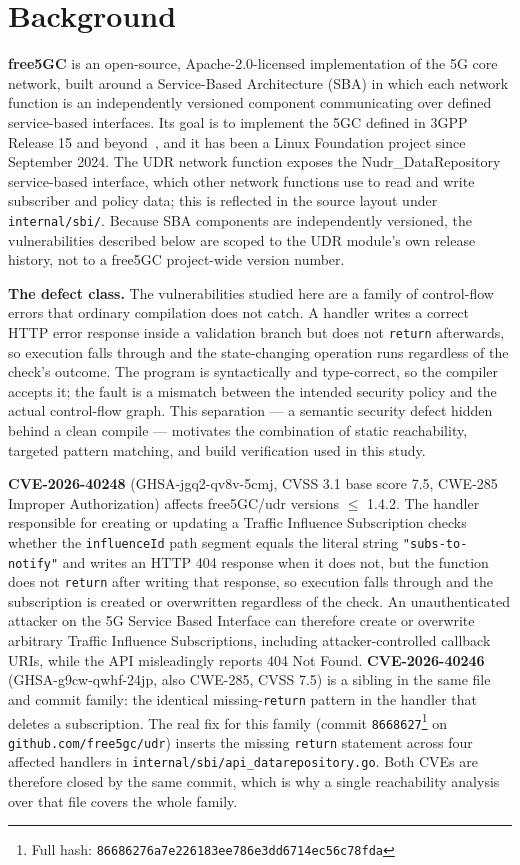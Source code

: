 \documentclass[sigconf]{acmart}
\begin{document}
\section{Background}

\textbf{free5GC} is an open-source, Apache-2.0-licensed implementation of the 5G
core network, built around a Service-Based Architecture (SBA) in which each
network function is an independently versioned component communicating over
defined service-based interfaces. Its goal is to implement the 5GC defined in
3GPP Release 15 and beyond~\cite{free5gc}, and it has been a Linux Foundation
project since September 2024. The UDR network function exposes the
Nudr\_DataRepository service-based interface, which other network functions use
to read and write subscriber and policy data; this is reflected in the source
layout under \texttt{internal/sbi/}. Because SBA components are independently
versioned, the vulnerabilities described below are scoped to the UDR module's own
release history, not to a free5GC project-wide version number.

\textbf{The defect class.} The vulnerabilities studied here are a family of
control-flow errors that ordinary compilation does not catch. A handler writes a
correct HTTP error response inside a validation branch but does not
\texttt{return} afterwards, so execution falls through and the state-changing
operation runs regardless of the check's outcome. The program is syntactically
and type-correct, so the compiler accepts it; the fault is a mismatch between the
intended security policy and the actual control-flow graph. This separation --- a
semantic security defect hidden behind a clean compile --- motivates the
combination of static reachability, targeted pattern matching, and build
verification used in this study.

\textbf{CVE-2026-40248} (GHSA-jgq2-qv8v-5cmj, CVSS 3.1 base score 7.5, CWE-285
Improper Authorization) affects free5GC/udr versions $\leq$ 1.4.2. The handler
responsible for creating or updating a Traffic Influence Subscription checks
whether the \texttt{influenceId} path segment equals the literal string
\texttt{"subs-to-notify"} and writes an HTTP 404 response when it does not, but
the function does not \texttt{return} after writing that response, so execution
falls through and the subscription is created or overwritten regardless of the
check. An unauthenticated attacker on the 5G Service Based Interface can
therefore create or overwrite arbitrary Traffic Influence Subscriptions,
including attacker-controlled callback URIs, while the API misleadingly reports
404 Not Found. \textbf{CVE-2026-40246} (GHSA-g9cw-qwhf-24jp, also CWE-285, CVSS
7.5) is a sibling in the same file and commit family: the identical
missing-\texttt{return} pattern in the handler that deletes a subscription. The
real fix for this family (commit \texttt{8668627}\footnote{Full hash:
\texttt{86686276a7e226183ee786e3dd6714ec56c78fda}} on
\texttt{github.com/free5gc/udr}) inserts the missing \texttt{return} statement
across four affected handlers in
\texttt{internal/sbi/api\_datarepository.go}. Both CVEs are therefore closed by
the same commit, which is why a single reachability analysis over that file
covers the whole family.
\end{document}
